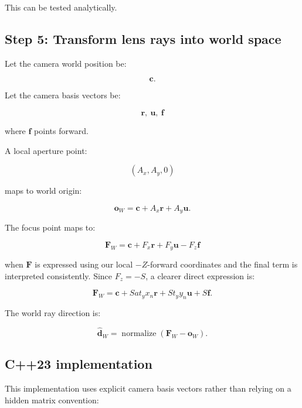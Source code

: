 This can be tested analytically.

\subsection{Step 5: Transform lens rays into world space}\label{02-foundations-ii-ch036-step-5-transform-lens-rays-into-world-space}

\hypertarget{02-foundations-ii-ch036-step-5-transform-lens-rays-into-world-space}{}

Let the camera world position be:

\[ \mathbf c. \]

Let the camera basis vectors be:

\[ \mathbf r,\ \mathbf u,\ \mathbf f \]

where \(\mathbf f\) points forward.

A local aperture point:

\[ (A_x,A_y,0) \]

maps to world origin:

\[ \boxed{ \mathbf o_W= \mathbf c+A_x\mathbf r+A_y\mathbf u. } \]

The focus point maps to:

\[ \boxed{ \mathbf F_W= \mathbf c+ F_x\mathbf r+ F_y\mathbf u- F_z\mathbf f } \]

when \(\mathbf F\) is expressed using our local \(-Z\)-forward coordinates and the final term is interpreted consistently. Since \(F_z=-S\), a clearer direct expression is:

\[ \boxed{ \mathbf F_W= \mathbf c+ Sa t_yx_n\mathbf r+ St_yy_n\mathbf u+ S\mathbf f. } \]

The world ray direction is:

\[ \boxed{ \hat{\mathbf d}_W= \operatorname{normalize}(\mathbf F_W-\mathbf o_W). } \]

\subsection{C++23 implementation}\label{02-foundations-ii-ch036-c23-implementation}

\hypertarget{02-foundations-ii-ch036-c23-implementation}{}

This implementation uses explicit camera basis vectors rather than relying on a hidden matrix convention:

